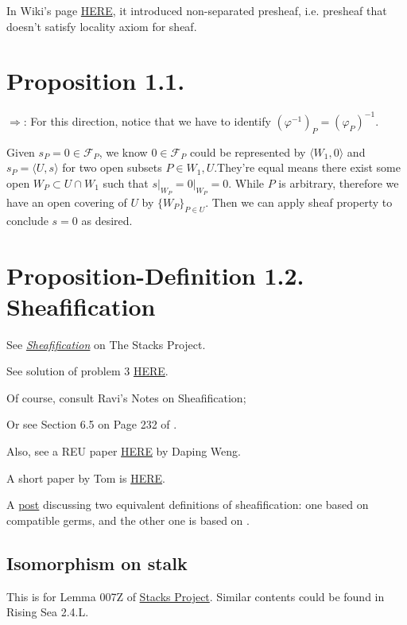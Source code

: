 In Wiki's page \href{https://en.wikipedia.org/wiki/Sheaf_(mathematics)}{HERE}, it introduced non-separated presheaf, i.e. presheaf that doesn't satisfy locality axiom for sheaf.
\section{Proposition 1.1.}

$\Rightarrow$: For this direction, notice that we have to identify $(\varphi^{-1})_P=(\varphi_P)^{-1}$.

Given $s_P=0\in\mathscr F_P$, we know $0\in \mathscr F_P$ could be represented by $\langle W_1,0\rangle$ and $s_P=\langle U,s\rangle$ for two open subsets $P\in W_1,U$.They're equal means there exist some open $W_P\subset U\cap W_1$ such that $s\vert_{W_P}=0\vert_{W_P}=0$. While $P$ is arbitrary, therefore we have an open covering of $U$ by $\{W_P\}_{P\in U}$. Then we can apply sheaf property to conclude $s=0$ as desired.

\section{Proposition-Definition 1.2. Sheafification}

See \href{https://stacks.math.columbia.edu/tag/007X}{\textit{Sheafification}} on The Stacks Project.

See solution of problem 3 \href{https://www2.math.ethz.ch/education/bachelor/lectures/fs2016/math/alg_geom/Solution11.pdf}{HERE}.

Of course, consult Ravi's Notes on Sheafification; 

Or see Section 6.5 on Page 232 of \cite{bosch2013algebraic}.

Also, see a REU paper \href{http://www.math.uchicago.edu/%7Emay/VIGRE/VIGRE2011/REUPapers/WengD.pdf}{HERE} by Daping Weng.

A short paper by Tom is \href{https://www.maths.ed.ac.uk/~tl/sheaves.pdf}{HERE}.

A \href{https://math.stackexchange.com/questions/889497/sheafification-definition}{post} discussing two equivalent definitions of sheafification: one based on compatible germs, and the other one is based on .

\subsection{Isomorphism on stalk}

This is for Lemma 007Z of \href{https://stacks.math.columbia.edu/tag/007X}{Stacks Project}. Similar contents could be found in Rising Sea 2.4.L.

